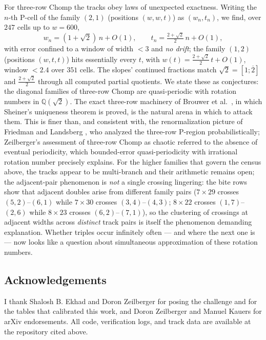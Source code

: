 \documentclass[11pt]{article}
\begin{document}
For three-row Chomp the tracks obey laws of unexpected exactness. Writing the $n$-th P-cell
of the family $(2,1)$ (positions $(w,w,t)$) as $(w_n,t_n)$, we find, over $247$ cells up to
$w=600$,
\[ w_n=(1+\sqrt2)\,n+O(1),\qquad t_n=\tfrac{2+\sqrt2}{2}\,n+O(1), \]
with error confined to a window of width $<3$ and \emph{no drift}; the family $(1,2)$
(positions $(w,t,t)$) hits essentially every $t$, with $w(t)=\tfrac{2+\sqrt2}{2}\,t+O(1)$,
window $<2.4$ over $351$ cells. The slopes' continued fractions match $\sqrt2=[1;\overline2]$
and $\tfrac{2+\sqrt2}{2}$ through all computed partial quotients. We state these as
conjectures: the diagonal families of three-row Chomp are quasi-periodic with rotation
numbers in $\mathbb{Q}(\sqrt2)$. The exact three-row machinery of Brouwer et
al.\ \cite{BHMS}, in which Sheiner's uniqueness theorem \cite{Sheiner} is proved, is the
natural arena in which to attack them. This is finer than, and consistent with, the renormalization
picture of Friedman and Landsberg \cite{FL}, who analyzed the three-row P-region
probabilistically; Zeilberger's assessment of three-row Chomp as chaotic \cite{Zchaos}
referred to the absence of eventual periodicity, which bounded-error quasi-periodicity with
irrational rotation number precisely explains. For the higher families that govern the
census above, the tracks appear to be multi-branch and their arithmetic remains open; the adjacent-pair phenomenon is \emph{not} a single crossing lingering: the bite rows show
that adjacent doubles arise from different family pairs ($7\times29$ crosses
$(5,2)$--$(6,1)$ while $7\times30$ crosses $(3,4)$--$(4,3)$; $8\times22$ crosses
$(1,7)$--$(2,6)$ while $8\times23$ crosses $(6,2)$--$(7,1)$), so the clustering of
crossings at adjacent widths across \emph{distinct} track pairs is itself the phenomenon
demanding explanation. Whether triples occur infinitely often --- and where the next one is --- now looks
like a question about simultaneous approximation of these rotation numbers.

\subsection*{Acknowledgements}
I thank Shalosh B. Ekhad and Doron Zeilberger for posing the challenge and for the tables
that calibrated this work, and Doron Zeilberger and Manuel Kauers for arXiv endorsements.
All code, verification logs, and track data are available at the repository cited above.
\end{document}
